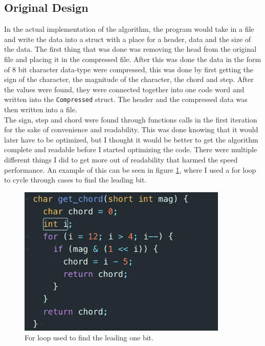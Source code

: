 \documentclass[12pt]{article}
\begin{document}
\subsection{Original Design}

In the actual implementation of the algorithm, the program would take in a file and write the data into a struct with a place for a header, data and the size of the data. The first thing that was done was removing the head from the original file and placing it in the compressed file. After this was done the data in the form of 8 bit character data-type were compressed, this was done by first getting the sign of the character, the magnitude of the character, the chord and step. After the values were found, they were connected together into one code word and written into the \texttt{Compressed} struct. The header and the compressed data was then written into a file.\\

The sign, step and chord were found through functions calls in the first iteration for the sake of convenience and readability. This was done knowing that it would later have to be optimized, but I thought it would be better to get the algorithm complete and readable before I started optimizing the code. There were multiple different things I did to get more out of readability that harmed the speed performance. An example of this can be seen in figure \ref{fig:chord_loop}, where I used a for loop to cycle through cases to find the leading bit.\\

\begin{figure}[!h]
		\centering
        \includegraphics[width=10cm ]
        {get_chord_for_loop.png}
        \caption{\label{fig:chord_loop} For loop used to find the leading one bit.}
\end{figure}
\end{document}
